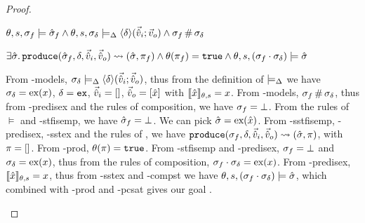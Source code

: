 \begin{proof}
\pfassume \begin{hypvlist}
 $\theta, s, \sigma_f \models \hat{\sigma}_f \land \theta, s, \sigma_\delta \models_{\Delta} \left<\delta\right>\!(\vec{\hat{v}}_i;\vec{v}_o) \land \sigma_f\operatorname{\#}\sigma_\delta$
\end{hypvlist}
\pfprove \begin{goalvlist}
 $\exists \hat{\sigma}\ldotp \texttt{produce}(\hat{\sigma}_f,\delta,\vec{\hat{v}}_i,\vec{\hat{v}}_o)\rightsquigarrow (\hat{\sigma},\pi_f) \land \theta(\pi_f)=\texttt{true} \land \theta,s,(\sigma_f\cdot\sigma_\delta) \models \hat{\sigma}$
\end{goalvlist}
\begin{hypvlist}
 From \hyp{models}, $\sigma_\delta\models_{\Delta} \left<\delta\right>\!(\vec{\hat{v}}_i;\vec{\hat{v}}_o)$, thus from the definition of $\models_{\Delta}$ we have $\sigma_\delta=\text{ex}(x)$, $\delta=\texttt{ex}$, $\vec{\hat{v}}_i=[]$, $\vec{\hat{v}}_o=[\hat{x}]$ with $\llbracket\hat{x}\rrbracket_{\theta,s}=x$.
 From \hyp{models}, $\sigma_f\operatorname{\#}\sigma_\delta$, thus from \hyp{predisex} and the rules of composition, we have $\sigma_f=\bot$.
 From the rules of $\models$ and \hyp{stfisemp}, we have $\hat{\sigma}_f=\bot$.
 We can pick $\hat{\sigma}=\text{ex}(\hat{x})$.
 From \hyp{sstfisemp}, \hyp{predisex}, \hyp{sstex} and the rules of \produce, we have ${\texttt{produce}(\sigma_f,\delta,\vec{\hat{v}}_i,\vec{\hat{v}}_o)\rightsquigarrow (\hat{\sigma},\pi)}$, with $\pi=[]$.
 From \hyp{prod}, $\theta(\pi)=\texttt{true}$.
 From \hyp{stfisemp} and \hyp{predisex}, $\sigma_f=\bot$ and $\sigma_\delta=\text{ex}(x)$, thus from the rules of composition, $\sigma_f\cdot\sigma_\delta=\text{ex}(x)$. 
 From \hyp{predisex}, $\llbracket\hat{x}\rrbracket_{\theta,s}=x$, thus from \hyp{sstex} and \hyp{compst} we have $\theta,s,(\sigma_f\cdot\sigma_\delta)\models\hat{\sigma}$, which combined with \hyp{prod} and \hyp{pcsat} gives our goal .

\end{hypvlist}

\end{proof}












